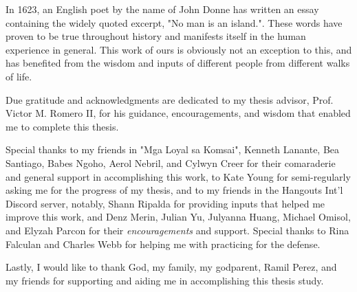 
In 1623, an English poet by the name of John Donne has written an essay containing the widely quoted excerpt, "No man is an island.". These words have proven to be true throughout history and manifests itself in the human experience in general. This work of ours is obviously not an exception to this, and has benefited from the wisdom and inputs of different people from different walks of life.

Due gratitude and acknowledgments are dedicated to my thesis advisor, Prof. Victor M. Romero II, for his guidance, encouragements, and wisdom that enabled me to complete this thesis.

Special thanks to my friends in "Mga Loyal sa Komsai", Kenneth Lanante, Bea Santiago, Babes Ngoho, Aerol Nebril, and Cylwyn Creer for their comaraderie and general support in accomplishing this work, to Kate Young for semi-regularly asking me for the progress of my thesis, and to my friends in the Hangouts Int'l Discord server, notably, Shann Ripalda for providing inputs that helped me improve this work, and Denz Merin, Julian Yu, Julyanna Huang, Michael Omisol, and Elyzah Parcon for their \textit{encouragements} and support. Special thanks to Rina Falculan and Charles Webb for helping me with practicing for the defense.

Lastly, I would like to thank God, my family, my godparent, Ramil Perez, and my friends for supporting and aiding me in accomplishing this thesis study.
